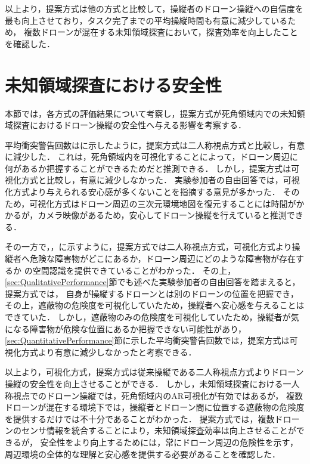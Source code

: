 \documentclass[a4paper,11pt]{ujreport}
\begin{document}
以上より，提案方式は他の方式と比較して，操縦者のドローン操縦への自信度を最も向上させており，タスク完了までの平均操縦時間も有意に減少しているため，
複数ドローンが混在する未知領域探査において，探査効率を向上したことを確認した．


\section{未知領域探査における安全性}
\label{sec:Safety}

本節では，各方式の評価結果について考察し，提案方式が死角領域内での未知領域探査におけるドローン操縦の安全性へ与える影響を考察する．
\par
平均衝突警告回数はに示したように，提案方式は二人称視点方式と比較し，有意に減少した．
これは，死角領域内を可視化することによって，ドローン周辺に何があるか把握することができるためだと推測できる．
しかし，提案方式は可視化方式と比較し，有意に減少しなかった．
実験参加者の自由回答では，可視化方式より与えられる安心感が多くないことを指摘する意見が多かった．
そのため，可視化方式はドローン周辺の三次元環境地図を復元することには時間がかかるが，カメラ映像があるため，安心してドローン操縦を行えていると推測できる．

その一方で，，に示すように，提案方式では二人称視点方式，可視化方式より操縦者へ危険な障害物がどこにあるか，ドローン周辺にどのような障害物が存在するか
の空間認識を提供できていることがわかった．
その上，\ref{sec:QualitativePerformance}節でも述べた実験参加者の自由回答を踏まえると，提案方式では，
自身が操縦するドローンとは別のドローンの位置を把握でき，その上，遮蔽物の危険度を可視化していたため，操縦者へ安心感を与えることはできていた．
しかし，遮蔽物のみの危険度を可視化していたため，操縦者が気になる障害物が危険な位置にあるか把握できない可能性があり，
\ref{sec:QuantitativePerformance}節に示した平均衝突警告回数では，提案方式は可視化方式より有意に減少しなかったと考察できる．

以上より，可視化方式，提案方式は従来操縦である二人称視点方式よりドローン操縦の安全性を向上させることができる．
しかし，未知領域探査における一人称視点でのドローン操縦では，死角領域内のAR可視化が有効ではあるが，
複数ドローンが混在する環境下では，操縦者とドローン間に位置する遮蔽物の危険度を提供するだけでは不十分であることがわかった．
提案方式では，複数ドローンのセンサ情報を統合することにより，未知領域探査効率は向上させることができるが，
安全性をより向上するためには，常にドローン周辺の危険性を示す，周辺環境の全体的な理解と安心感を提供する必要があることを確認した．
\end{document}
